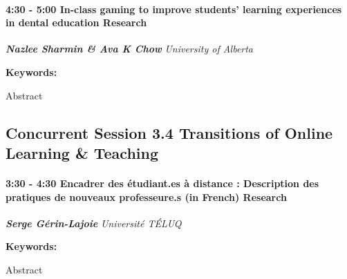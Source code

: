 \documentclass[
]{book}
\begin{document}
\begin{session}
\hypertarget{in-class-gaming-to-improve-students-learning-experiences-in-dental-education-research}{%
\paragraph*{\texorpdfstring{4:30 - 5:00 \textbar{} \textbf{In-class
gaming to improve students' learning experiences in dental education}
\textbar{}
Research}{4:30 - 5:00 \textbar{} In-class gaming to improve students' learning experiences in dental education \textbar{} Research}}\label{in-class-gaming-to-improve-students-learning-experiences-in-dental-education-research}}

\textbf{\emph{Nazlee Sharmin \& Ava K Chow}} \textbar{} \emph{University
of Alberta}

\textbf{Keywords:}

Abstract
\end{session}

\hypertarget{concurrent-session-3.4-transitions-of-online-learning-teaching}{%
\subsection*{Concurrent Session 3.4 \textbar{} Transitions of Online Learning \& Teaching}\label{concurrent-session-3.4-transitions-of-online-learning-teaching}}

\begin{session}
\hypertarget{encadrer-des-uxe9tudiant.es-uxe0-distance-description-des-pratiques-de-nouveaux-professeure.s-in-french-research}{%
\paragraph*{\texorpdfstring{3:30 - 4:30 \textbar{} \textbf{Encadrer des
étudiant.es à distance : Description des pratiques de nouveaux
professeure.s (in French)} \textbar{}
Research}{3:30 - 4:30 \textbar{} Encadrer des étudiant.es à distance : Description des pratiques de nouveaux professeure.s (in French) \textbar{} Research}}\label{encadrer-des-uxe9tudiant.es-uxe0-distance-description-des-pratiques-de-nouveaux-professeure.s-in-french-research}}

\textbf{\emph{Serge Gérin-Lajoie}} \textbar{} \emph{Université TÉLUQ}

\textbf{Keywords:}

Abstract
\end{session}
\end{document}
